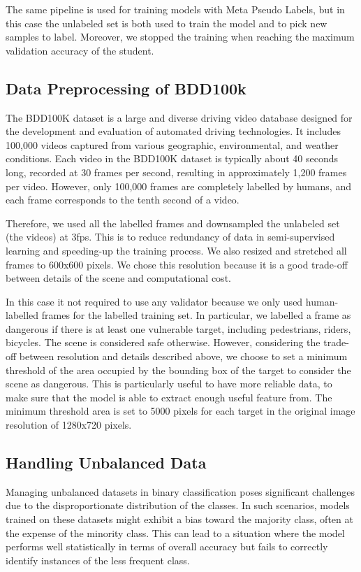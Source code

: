 The same pipeline is used for training models with Meta Pseudo Labels, but in 
this case the unlabeled set is both used to train the model and to pick new 
samples to label. Moreover, we stopped the training when reaching the maximum 
validation accuracy of the student. 

\subsection{Data Preprocessing of BDD100k}
The BDD100K dataset is a large and diverse driving video database designed for 
the development and evaluation of automated driving technologies. It includes 
100,000 videos captured from various geographic, environmental, and weather 
conditions.
Each video in the BDD100K dataset is typically about 40 seconds long, recorded 
at 30 frames per second, resulting in approximately 1,200 frames per video. 
However, only 100,000 frames are completely labelled by humans, and each frame 
corresponds to the tenth second of a video.

Therefore, we used all the labelled frames and downsampled the unlabeled set (the 
videos) at 3fps. This is to reduce redundancy of data in semi-supervised 
learning and speeding-up the training process.
We also resized and stretched all frames to 600x600 pixels. We chose this 
resolution because it is a good trade-off between details of the scene and 
computational cost.

In this case it not required to use any validator because we only used 
human-labelled frames for the labelled training set. In particular, we labelled 
a frame as dangerous if there is at least one vulnerable target, including 
pedestrians, riders, bicycles. The scene is considered safe otherwise.
However, considering the trade-off between resolution and details described above, 
we choose to set a minimum threshold of the area occupied by the bounding box 
of the target to consider the scene as dangerous. This is particularly useful 
to have more reliable data, to make sure that the model is able to extract 
enough useful feature from.
The minimum threshold area is set to 5000 pixels for each target in the original 
image resolution of 1280x720 pixels.

\subsection{Handling Unbalanced Data}
Managing unbalanced datasets in binary classification poses significant challenges 
due to the disproportionate distribution of the classes. In such scenarios, 
models trained on these datasets might exhibit a bias toward the majority class, 
often at the expense of the minority class. This can lead to a situation where 
the model performs well statistically in terms of overall accuracy but fails to 
correctly identify instances of the less frequent class.

